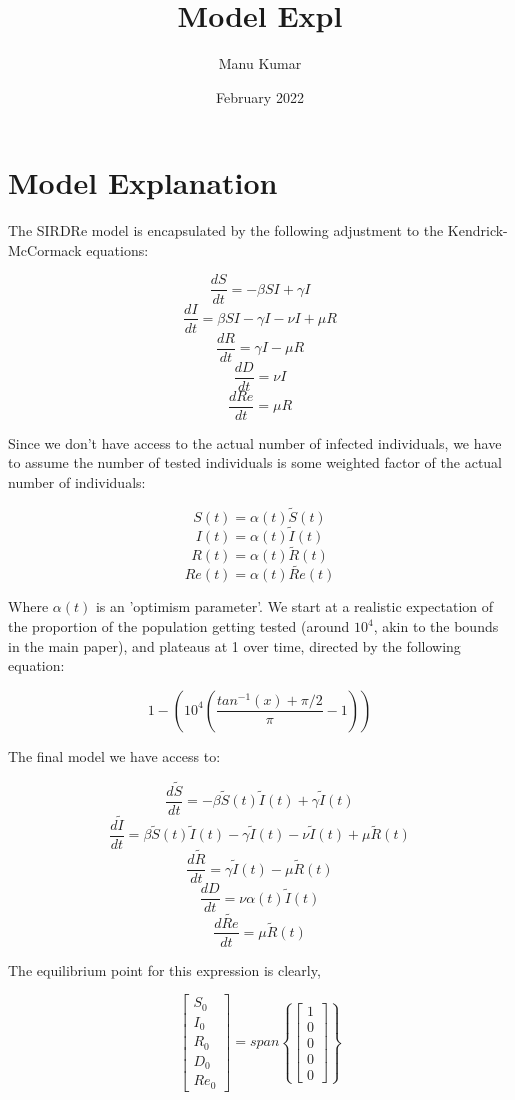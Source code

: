 \documentclass{article}
\title{Model Expl}
\author{Manu Kumar}
\date{February 2022}
\begin{document}
\section{Model Explanation}

The SIRDRe model is encapsulated by the following adjustment to the Kendrick-McCormack equations:

$$ \frac{dS}{dt} = - \beta SI + \gamma I $$
$$ \frac{dI}{dt} = \beta SI - \gamma I - \nu I + \mu R $$
$$ \frac{dR}{dt} = \gamma I - \mu R $$
$$ \frac{dD}{dt} = \nu I $$
$$ \frac{dRe}{dt} = \mu R $$

Since we don't have access to the actual number of infected individuals, 
we have to assume the number of tested individuals is some weighted factor of the actual number of individuals:

$$ S(t) = \alpha(t)\tilde{S}(t) $$
$$ I(t) = \alpha(t)\tilde{I}(t) $$
$$ R(t) = \alpha(t)\tilde{R}(t) $$
$$ Re(t) = \alpha(t)\tilde{Re}(t) $$ 

Where $\alpha(t)$ is an 'optimism parameter'. 
We start at a realistic expectation of the proportion of the population getting tested 
(around $10^4$, akin to the bounds in the main paper), and plateaus at 1 over time, 
directed by the following equation:

$$ 1 - \left( 10^4 \left( \frac{tan^{-1}(x) + \pi / 2}{\pi} - 1\right) \right) $$

The final model we have access to:

$$ \frac{d\tilde{S}}{dt} = - \beta \tilde{S}(t)\tilde{I}(t) + \gamma \tilde{I}(t) $$
$$ \frac{d\tilde{I}}{dt} = \beta \tilde{S}(t)\tilde{I}(t) - \gamma \tilde{I}(t) - \nu \tilde{I}(t) + \mu \tilde{R}(t) $$
$$ \frac{d\tilde{R}}{dt} = \gamma \tilde{I}(t) - \mu \tilde{R}(t) $$
$$ \frac{dD}{dt} = \nu \alpha(t) \tilde{I}(t) $$
$$ \frac{d\tilde{Re}}{dt} = \mu \tilde{R}(t) $$

The equilibrium point for this expression is clearly,

$$
\begin{bmatrix}
    S_0 \\ 
    I_0 \\
    R_0 \\
    D_0 \\
    Re_0
\end{bmatrix} 
= 
span \left\{ \begin{bmatrix} 1 \\ 0 \\ 0 \\ 0 \\ 0 \end{bmatrix} \right\}
$$
\end{document}
